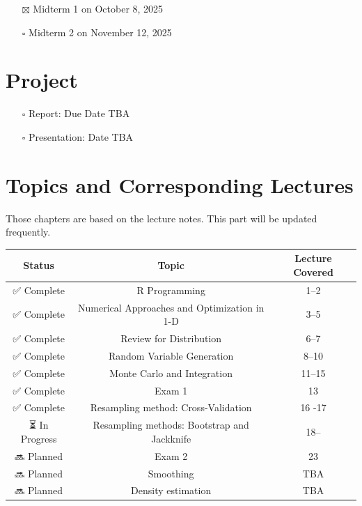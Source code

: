 \documentclass[
  letterpaper,
  DIV=11,
  numbers=noendperiod]{scrreprt}
\providecommand{\tightlist}{%
  \setlength{\itemsep}{0pt}\setlength{\parskip}{0pt}}
\begin{document}
\begin{itemize}
\tightlist
\item[$\boxtimes$]
  Midterm 1 on October 8, 2025
\item[$\square$]
  Midterm 2 on November 12, 2025
\end{itemize}

\section*{Project}\label{project}


\begin{itemize}
\tightlist
\item[$\square$]
  Report: Due Date TBA
\item[$\square$]
  Presentation: Date TBA
\end{itemize}

\section*{Topics and Corresponding
Lectures}\label{topics-and-corresponding-lectures}


Those chapters are based on the lecture notes. This part will be updated
frequently.

\begin{longtable}[]{@{}ccc@{}}
\toprule\noalign{}
Status & Topic & Lecture Covered \\
\midrule\noalign{}
\endhead
\bottomrule\noalign{}
\endlastfoot
✅ Complete & R Programming & 1--2 \\
✅ Complete & Numerical Approaches and Optimization in 1-D & 3--5 \\
✅ Complete & Review for Distribution & 6--7 \\
✅ Complete & Random Variable Generation & 8--10 \\
✅ Complete & Monte Carlo and Integration & 11--15 \\
✅ Complete & Exam 1 & 13 \\
✅ Complete & Resampling method: Cross-Validation & 16 -17 \\
⏳ In Progress & Resampling methods: Bootstrap and Jackknife & 18-- \\
🔜 Planned & Exam 2 & 23 \\
🔜 Planned & Smoothing & TBA \\
🔜 Planned & Density estimation & TBA \\
\end{longtable}
\end{document}
